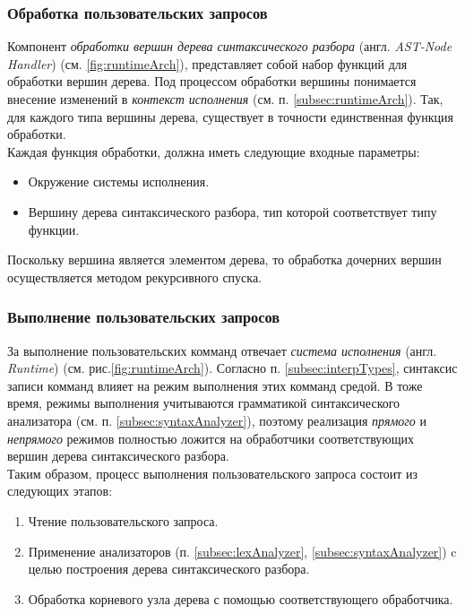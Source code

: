 \documentclass[12pt]{article}
\begin{document}
			\subsubsection{Обработка пользовательских запросов}
			\hspace{\parindent} Компонент {\it обработки вершин дерева синтаксического разбора} (англ. {\it AST-Node Handler}) (см. \ref{fig:runtimeArch}), представляет собой набор функций для обработки вершин дерева. Под процессом обработки вершины понимается внесение изменений в {\it контекст исполнения} (см. п. \ref{subsec:runtimeArch}). Так, для каждого типа вершины дерева, существует в точности единственная функция обработки. \\
			\indent Каждая функция обработки, должна иметь следующие входные параметры:
			\begin{itemize}
				\item Окружение системы исполнения.
				\item Вершину дерева синтаксического разбора, тип которой соответствует типу функции.
			\end{itemize}
			
			\indent Поскольку вершина является элементом дерева, то обработка дочерних вершин осуществляется методом рекурсивного спуска.

			\subsubsection{Выполнение пользовательских запросов}
			\hspace{\parindent} За выполнение пользовательских комманд отвечает {\it система исполнения} (англ. {\it Runtime}) (см. рис.\ref{fig:runtimeArch}). Согласно п. \ref{subsec:interpTypes}, синтаксис записи комманд влияет на режим выполнения этих комманд средой. В тоже время, режимы выполнения учитываются грамматикой синтаксического анализатора (см. п. \ref{subsec:syntaxAnalyzer}), поэтому реализация {\it прямого} и {\it непрямого} режимов полностью ложится на обработчики соответствующих вершин дерева синтаксического разбора. \\   
			\indent Таким образом, процесс выполнения пользовательского запроса состоит из следующих этапов:
			\begin{enumerate}
				\item Чтение пользовательского запроса.
				\item Применение анализаторов (п. \ref{subsec:lexAnalyzer}, \ref{subsec:syntaxAnalyzer}) c целью построения дерева синтаксического разбора.
				\item Обработка корневого узла дерева с помощью соответствующего обработчика.
			\end{enumerate}
			
\end{document}
